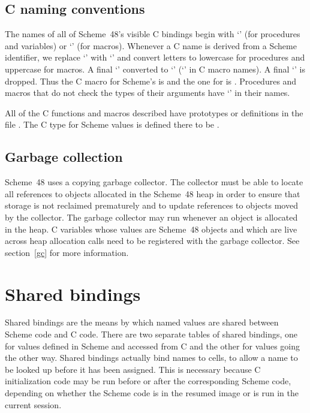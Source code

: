 \subsection{C naming conventions}

The names of all of Scheme~48's visible C bindings begin 
 with `' (for procedures and variables) or 
 `' (for macros).
Whenever a C name is derived from a Scheme identifier, we
 replace `\code{-}' with `\code{\_}' and convert letters to lowercase
 for procedures and uppercase for macros.
A final `'  converted to `' (`' in C macro names).
A final `\code{!}' is dropped.
Thus the C macro for Scheme's  is  and
 the one for  is .
Procedures and macros that do not check the types of their arguments
 have `' in their names.

All of the C functions and macros described have prototypes or definitions
 in the file .
The C type for Scheme values is defined there to be .

\subsection{Garbage collection}

Scheme~48 uses a copying garbage collector.
The collector must be able to locate all references
 to objects allocated in the Scheme~48 heap in order to ensure that
 storage is not reclaimed prematurely and to update references to objects
 moved by the collector.
The garbage collector may run whenever an object is allocated in the heap.
C variables whose values are Scheme~48 objects and which are live across
 heap allocation calls need to be registered with
 the
garbage collector.  See section~\ref{gc} for more information.

\section{Shared bindings}
\label{sec:shared-bindings}

Shared bindings are the means by which named values are shared between Scheme
 code and C code.
There are two separate tables of shared bindings, one for values defined in
 Scheme and accessed from C and the other for values going the other way.
Shared bindings actually bind names to cells, to allow a name to be looked
 up before it has been assigned.
This is necessary because C initialization code may be run before or after
 the corresponding Scheme code, depending on whether the Scheme code is in
 the resumed image or is run in the current session.


